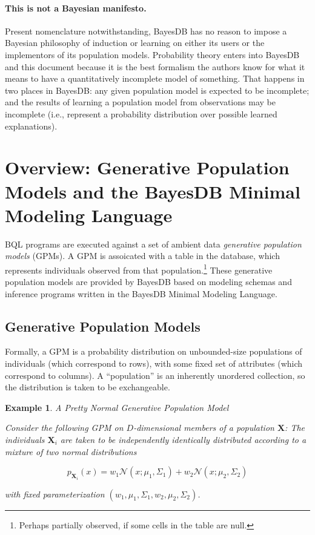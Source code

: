 \documentclass[10pt,letterpaper]{article}
\newtheorem{example}{Example}[section]
\begin{document}
\paragraph{This is not a Bayesian manifesto.}  Present nomenclature
notwithstanding, BayesDB has no reason to impose a Bayesian philosophy
of induction or learning on either its users or the implementors of
its population models.  Probability theory enters into BayesDB and
this document because it is the best formalism the authors know for
what it means to have a quantitatively incomplete model of something.
That happens in two places in BayesDB: any given population model is
expected to be incomplete; and the results of learning a population
model from observations may be incomplete (i.e., represent a
probability distribution over possible learned explanations).


\section{Overview: Generative Population Models and the BayesDB Minimal Modeling Language}
\label{sec:overview}

BQL programs are executed against a set of ambient data
\textit{generative population models} (GPMs).  A GPM is assoicated
with a table in the database, which represents individuals observed
from that population.\footnote{Perhaps partially observed, if some cells in the
  table are null.} These generative population models are provided by
BayesDB based on modeling schemas and inference programs written in
the BayesDB Minimal Modeling Language.

\subsection{Generative Population Models}

Formally, a GPM is a probability distribution on unbounded-size
populations of individuals (which correspond to rows), with some fixed
set of attributes (which correspond to columns). A ``population'' is
an inherently unordered collection, so the distribution is taken to be
exchangeable.

\begin{example} \label{ex:normal_gpm} A Pretty Normal Generative Population
Model

Consider the following GPM on $D$-dimensional members of
a population $\mathbf{X}$: The individuals $\mathbf{X}_i$ are taken to
be independently identically distributed according to a mixture of two
normal distributions

\[ p_{\mathbf{X}_i}(x) = w_1\mathcal{N}(x;\mu_1,\Sigma_1) +
 w_2\mathcal{N}(x;\mu_2,\Sigma_2) \]

with fixed parameterization $(w_1, \mu_1, \Sigma_1, w_2, \mu_2, \Sigma_2)$.
\end{example}
\end{document}
